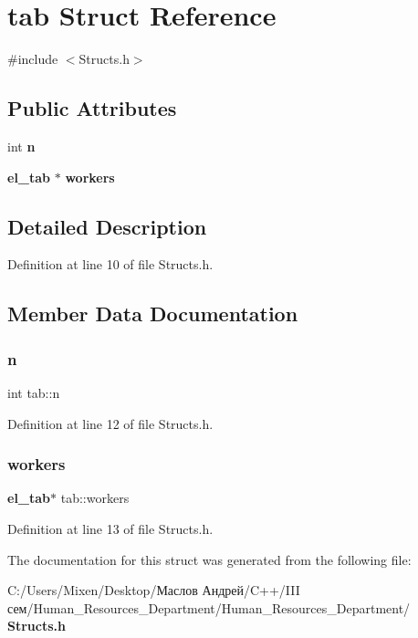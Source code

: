 \section{tab Struct Reference}
\label{structtab}


{\ttfamily \#include $<$Structs.\+h$>$}

\subsection*{Public Attributes}
\begin{DoxyCompactItemize}
\item 
int \textbf{ n}
\item 
\textbf{ el\+\_\+tab} $\ast$ \textbf{ workers}
\end{DoxyCompactItemize}


\subsection{Detailed Description}


Definition at line 10 of file Structs.\+h.



\subsection{Member Data Documentation}
\mbox{\label{structtab_a277daf05539090402f78eb4d17f401a2}} 
\subsubsection{n}
{\footnotesize\ttfamily int tab\+::n}



Definition at line 12 of file Structs.\+h.

\mbox{\label{structtab_a6212e72593b78ec4ff8b660327602e79}} 
\subsubsection{workers}
{\footnotesize\ttfamily \textbf{ el\+\_\+tab}$\ast$ tab\+::workers}



Definition at line 13 of file Structs.\+h.



The documentation for this struct was generated from the following file\+:\begin{DoxyCompactItemize}
\item 
C\+:/\+Users/\+Mixen/\+Desktop/Маслов Андрей/\+C++/\+I\+I\+I сем/\+Human\+\_\+\+Resources\+\_\+\+Department/\+Human\+\_\+\+Resources\+\_\+\+Department/\textbf{ Structs.\+h}\end{DoxyCompactItemize}
